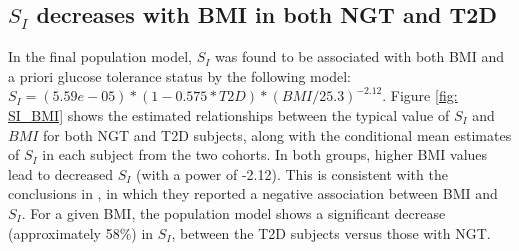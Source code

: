 \documentclass[utf8]{frontiersSCNS} %
\begin{document}
\vskip 0.5cm
\subsection{$S_I$ decreases with BMI in both NGT and T2D}
In the final population model, $S_I$ was found to be associated with both BMI and a priori glucose tolerance status by the following model: $S_I=(5.59e-05)*(1-0.575*T2D)*(BMI/25.3)^{-2.12}$. Figure \ref{fig: SI_BMI} shows the estimated relationships between the typical value of $S_I$ and $BMI$ for both NGT and T2D subjects, along with the conditional mean estimates of $S_I$ in each subject from the two cohorts. In both groups, higher BMI values lead to decreased $S_I$ (with a power of -2.12). This is consistent with the conclusions in \citet{Bergman1997TheTolerance}, in which they reported a negative association between BMI and $S_I$. For a given BMI, the population model shows a significant decrease (approximately 58\%) in $S_I$, between the T2D subjects versus those with NGT.\\
\vskip 0.5cm
\end{document}
